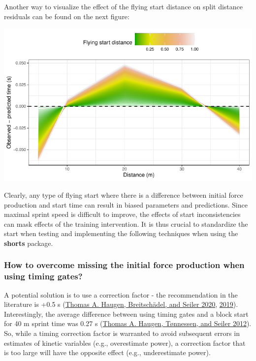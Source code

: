 \documentclass[fleqn,10pt]{wlpeerj} %
\begin{document}
\normalsize

Another way to visualize the effect of the flying start distance on split distance residuals can be found on the next figure:

\small

\begin{center}\includegraphics[width=0.9\linewidth]{paper_files/figure-latex/unnamed-chunk-31-1} \end{center}

\normalsize

Clearly, any type of flying start where there is a difference between initial force production and start time can result in biased parameters and predictions. Since maximal sprint speed is difficult to improve, the effects of start inconsistencies can mask effects of the training intervention. It is thus crucial to standardize the start when testing and implementing the following techniques when using the \textbf{shorts} package.

\hypertarget{how-to-overcome-missing-the-initial-force-production-when-using-timing-gates}{%
\subsubsection{How to overcome missing the initial force production when using timing gates?}\label{how-to-overcome-missing-the-initial-force-production-when-using-timing-gates}}

A potential solution is to use a correction factor - the recommendation in the literature is +0.5 s (\protect\hyperlink{ref-haugenSprintMechanicalProperties2020}{Thomas A. Haugen, Breitschädel, and Seiler 2020}, \protect\hyperlink{ref-haugenSprintMechanicalVariables2019}{2019}). Interestingly, the average difference between using timing gates and a block start for 40 m sprint time was 0.27 s (\protect\hyperlink{ref-haugenDifferenceStartImpact2012}{Thomas A. Haugen, Tønnessen, and Seiler 2012}). So, while a timing correction factor is warranted to avoid subsequent errors in estimates of kinetic variables (e.g., overestimate power), a correction factor that is too large will have the opposite effect (e.g., underestimate power).
\end{document}

